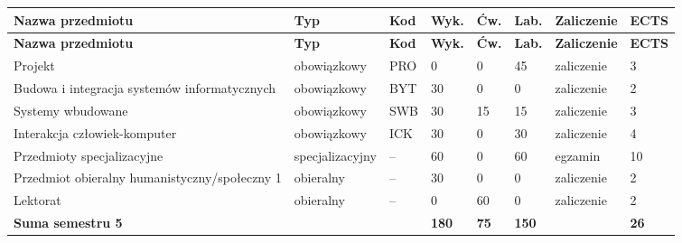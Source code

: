 \documentclass[12pt,a4paper]{article}
\newcommand{\thdrule}{\noalign{\global\setlength{\extrarowheight}{0pt}}}
\newcommand{\thdend}{\noalign{\global\setlength{\extrarowheight}{4pt}}}
\begin{document}
{\scriptsize
\begin{longtable}{m{5.0cm}m{1.9cm}m{0.75cm}m{0.85cm}m{0.85cm}m{0.85cm}m{1.45cm}m{0.9cm}}
\thdrule\toprule
\rowcolor{pjatkRed}
{\color{white}\footnotesize\textbf{\vphantom{Ag}Nazwa przedmiotu}} & {\color{white}\footnotesize\textbf{\vphantom{Ag}Typ}} & {\color{white}\footnotesize\textbf{\vphantom{Ag}Kod}} & {\color{white}\footnotesize\textbf{\vphantom{Ag}Wyk.}} & {\color{white}\footnotesize\textbf{\vphantom{Ag}Ćw.}} & {\color{white}\footnotesize\textbf{\vphantom{Ag}Lab.}} & {\color{white}\footnotesize\textbf{\vphantom{Ag}Zaliczenie}} & {\color{white}\footnotesize\textbf{\vphantom{Ag}ECTS}} \\
\midrule\thdend
\endfirsthead
\thdrule\toprule
\rowcolor{pjatkRed}
{\color{white}\footnotesize\textbf{\vphantom{Ag}Nazwa przedmiotu}} & {\color{white}\footnotesize\textbf{\vphantom{Ag}Typ}} & {\color{white}\footnotesize\textbf{\vphantom{Ag}Kod}} & {\color{white}\footnotesize\textbf{\vphantom{Ag}Wyk.}} & {\color{white}\footnotesize\textbf{\vphantom{Ag}Ćw.}} & {\color{white}\footnotesize\textbf{\vphantom{Ag}Lab.}} & {\color{white}\footnotesize\textbf{\vphantom{Ag}Zaliczenie}} & {\color{white}\footnotesize\textbf{\vphantom{Ag}ECTS}} \\
\midrule\thdend
\endhead
\rowcolor{tableRowLight} Projekt & {\scriptsize obowiązkowy} & PRO & 0 & 0 & 45 & {\scriptsize zaliczenie} & 3 \\
\rowcolor{tableRowAlt} Budowa i integracja systemów informatycznych & {\scriptsize obowiązkowy} & BYT & 30 & 0 & 0 & {\scriptsize zaliczenie} & 2 \\
\rowcolor{tableRowLight} Systemy wbudowane & {\scriptsize obowiązkowy} & SWB & 30 & 15 & 15 & {\scriptsize zaliczenie} & 3 \\
\rowcolor{tableRowAlt} Interakcja człowiek-komputer & {\scriptsize obowiązkowy} & ICK & 30 & 0 & 30 & {\scriptsize zaliczenie} & 4 \\
\rowcolor{tableElective} Przedmioty specjalizacyjne & {\scriptsize specjalizacyjny} & -- & 60 & 0 & 60 & {\scriptsize egzamin} & 10 \\
\rowcolor{tableElective} Przedmiot obieralny humanistyczny/społeczny 1 & {\scriptsize obieralny} & -- & 30 & 0 & 0 & {\scriptsize zaliczenie} & 2 \\
\rowcolor{tableElective} Lektorat & {\scriptsize obieralny} & -- & 0 & 60 & 0 & {\scriptsize zaliczenie} & 2 \\
\midrule[\heavyrulewidth]
\rowcolor{tableSummary} \textbf{Suma semestru 5} & & & \textbf{180} & \textbf{75} & \textbf{150} & & \textbf{26} \\
\bottomrule
\end{longtable}}
\end{document}
